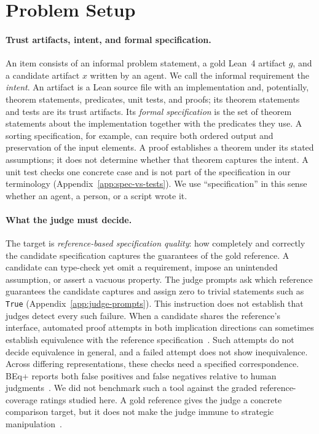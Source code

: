 \section{Problem Setup}\label{sec:problem-setup}
\paragraph{Trust artifacts, intent, and formal specification.}
An item consists of an informal problem statement, a gold Lean~4 artifact $g$, and a candidate artifact $x$ written by an agent.
We call the informal requirement the \emph{intent}.
An artifact is a Lean source file with an implementation and, potentially, theorem statements, predicates, unit tests, and proofs; its theorem statements and tests are its trust artifacts.
Its \emph{formal specification} is the set of theorem statements about the implementation together with the predicates they use.
A sorting specification, for example, can require both ordered output and preservation of the input elements.
A proof establishes a theorem under its stated assumptions; it does not determine whether that theorem captures the intent.
A unit test checks one concrete case and is not part of the specification in our terminology (Appendix~\ref{app:spec-vs-tests}).
We use ``specification'' in this sense whether an agent, a person, or a script wrote it.

\paragraph{What the judge must decide.}
The target is \emph{reference-based specification quality}: how completely and correctly the candidate specification captures the guarantees of the gold reference.
A candidate can type-check yet omit a requirement, impose an unintended assumption, or assert a vacuous property.
The judge prompts ask which reference guarantees the candidate captures and assign zero to trivial statements such as \texttt{True} (Appendix~\ref{app:judge-prompts}).
This instruction does not establish that judges detect every such failure.
When a candidate shares the reference's interface, automated proof attempts in both implication directions can sometimes establish equivalence with the reference specification~\citep{lahiri2024evaluating,poiroux2025beq}.
Such attempts do not decide equivalence in general, and a failed attempt does not show inequivalence.
Across differing representations, these checks need a specified correspondence.
BEq+ reports both false positives and false negatives relative to human judgments~\citep{poiroux2025beq}.
We did not benchmark such a tool against the graded reference-coverage ratings studied here.
A gold reference gives the judge a concrete comparison target, but it does not make the judge immune to strategic manipulation~\citep{robertson2025stepbystep}.

